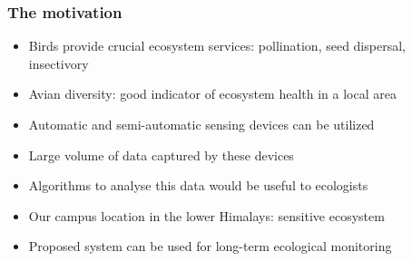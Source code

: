 \documentclass[mathserif]{beamer}
\begin{document}
\begin{frame}
\frametitle{The motivation}
\begin{itemize}
\item<2-> Birds provide crucial ecosystem services: pollination, seed dispersal,
insectivory
\item<3-> Avian diversity: good indicator of ecosystem health in a local area
\item<4-> Automatic and semi-automatic sensing devices can be utilized
\item<5-> Large volume of data captured by these devices
\item<6-> Algorithms to analyse this data would be useful to ecologists
\item<7-> Our campus location in the lower Himalays: sensitive ecosystem
\item<8-> Proposed system can be used for long-term ecological monitoring
\end{itemize}
\end{frame}
\end{document}
